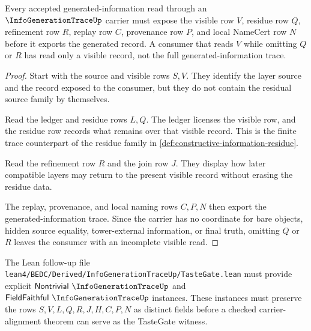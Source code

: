 \begin{theorem}
\label{thm:info-generation-trace-visible-residue}
Every accepted generated-information read through an $\InfoGenerationTraceUp$ carrier must expose the visible row $V$, residue row $Q$, refinement row $R$, replay row $C$, provenance row $P$, and local NameCert row $N$ before it exports the generated record. A consumer that reads $V$ while omitting $Q$ or $R$ has read only a visible record, not the full generated-information trace.
\end{theorem}
\begin{proof}
Start with the source and visible rows $S,V$. They identify the layer source and the record exposed to the consumer, but they do not contain the residual source family by themselves.

Read the ledger and residue rows $L,Q$. The ledger licenses the visible row, and the residue row records what remains over that visible record. This is the finite trace counterpart of the residue family in \autoref{def:constructive-information-residue}.

Read the refinement row $R$ and the join row $J$. They display how later compatible layers may return to the present visible record without erasing the residue data.

The replay, provenance, and local naming rows $C,P,N$ then export the generated-information trace. Since the carrier has no coordinate for bare objects, hidden source equality, tower-external information, or final truth, omitting $Q$ or $R$ leaves the consumer with an incomplete visible read.
\end{proof}



The Lean follow-up file \texttt{lean4/BEDC/Derived/InfoGenerationTraceUp/TasteGate.lean} must provide explicit $\mathsf{Nontrivial}\ \InfoGenerationTraceUp$ and $\mathsf{FieldFaithful}\ \InfoGenerationTraceUp$ instances. These instances must preserve the rows $S,V,L,Q,R,J,H,C,P,N$ as distinct fields before a checked carrier-alignment theorem can serve as the TasteGate witness.

